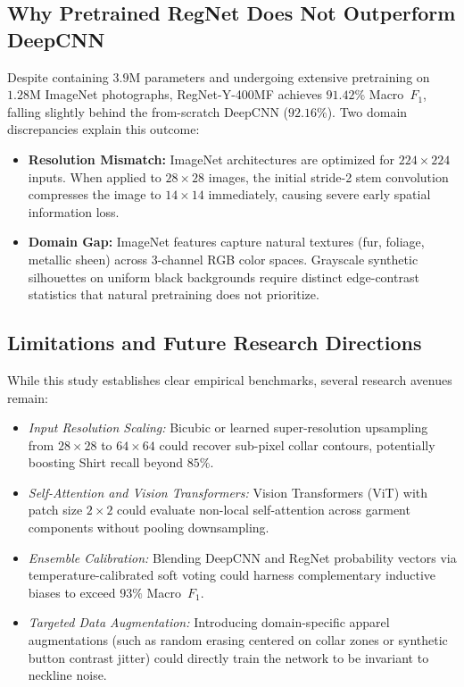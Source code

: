 \documentclass[conference]{IEEEtran}
\begin{document}
\subsection{Why Pretrained RegNet Does Not Outperform DeepCNN}
Despite containing $3.9\text{M}$ parameters and undergoing extensive pretraining on $1.28\text{M}$ ImageNet photographs, RegNet-Y-400MF achieves $91.42\%$ Macro~$F_1$, falling slightly behind the from-scratch DeepCNN ($92.16\%$). Two domain discrepancies explain this outcome:
\begin{itemize}
    \item \textbf{Resolution Mismatch:} ImageNet architectures are optimized for $224\times224$ inputs. When applied to $28\times28$ images, the initial stride-2 stem convolution compresses the image to $14\times14$ immediately, causing severe early spatial information loss.
    \item \textbf{Domain Gap:} ImageNet features capture natural textures (fur, foliage, metallic sheen) across 3-channel RGB color spaces. Grayscale synthetic silhouettes on uniform black backgrounds require distinct edge-contrast statistics that natural pretraining does not prioritize.
\end{itemize}

\subsection{Limitations and Future Research Directions}
While this study establishes clear empirical benchmarks, several research avenues remain:
\begin{itemize}
    \item \emph{Input Resolution Scaling:} Bicubic or learned super-resolution upsampling from $28\times28$ to $64\times64$ could recover sub-pixel collar contours, potentially boosting Shirt recall beyond $85\%$.
    \item \emph{Self-Attention and Vision Transformers:} Vision Transformers (ViT) with patch size $2\times2$ could evaluate non-local self-attention across garment components without pooling downsampling.
    \item \emph{Ensemble Calibration:} Blending DeepCNN and RegNet probability vectors via temperature-calibrated soft voting could harness complementary inductive biases to exceed $93\%$ Macro~$F_1$.
    \item \emph{Targeted Data Augmentation:} Introducing domain-specific apparel augmentations (such as random erasing centered on collar zones or synthetic button contrast jitter) could directly train the network to be invariant to neckline noise.
\end{itemize}
\end{document}
